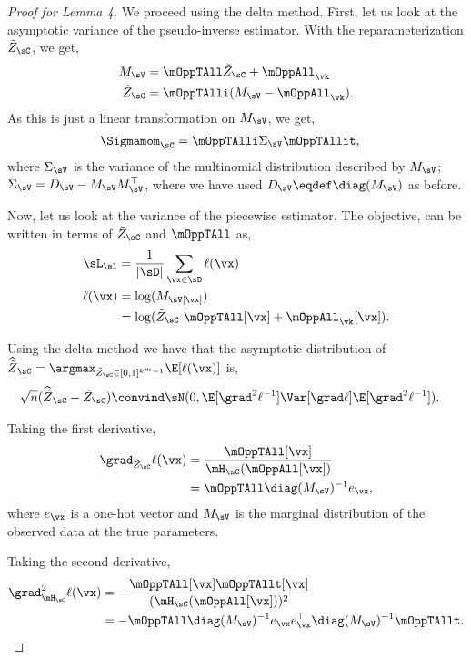 \begin{proof}[Proof for Lemma 4]
  We proceed using the delta method. First, let us look at the
  asymptotic variance of the pseudo-inverse estimator. With the
  reparameterization $\tilde Z_\sC$, we get,
  \begin{align*}
    M_\sV &= \mOppTAll \tilde Z_\sC + \mOppAll_\vk \\
    \tilde Z_\sC &= \mOppTAlli (M_\sV - \mOppAll_\vk).
  \end{align*}
  As this is just a linear transformation on $M_\sV$, we get,
  \begin{align*}
      \Sigmamom_{\sC} &= \mOppTAlli \Sigma_\sV \mOppTAllit,
  \end{align*}
  where $\Sigma_\sV$ is the variance of the multinomial distribution
  described by $M_\sV$; $\Sigma_\sV = D_\sV - M_\sV M_\sV^\top$, where
  we have used $D_\sV \eqdef \diag(M_\sV)$ as before.

  Now, let us look at the variance of the piecewise estimator.  The
  objective,  can be written in terms of
  $\tilde Z_\sC$ and $\mOppTAll$ as,
  \begin{align*}
    \sL_\ml &= \frac{1}{|\sD|} \sum_{\vx \in \sD} \ell(\vx) \\
    \ell(\vx) &= \log(M_\sV[\vx]) \\
              &= \log(\tilde Z_\sC\ \mOppTAll[\vx] + \mOppAll_{\vk}[\vx]).
  \end{align*}

Using the delta-method \cite{vaart98asymptotic} we have that the asymptotic distribution of 
  $\widehat{{\tilde Z}}_\sC = \argmax_{\tilde Z_\sC \in [0,1]^{k^m-1}} \E[\ell(\vx)]$ is,
  \begin{align*}
    \sqrt{n}(\widehat{\tilde{Z}}_{\sC} - \tilde{Z}_{\sC}) 
      &\convind \sN( 0, \E[\grad^2 \ell^{-1}] \Var[\grad \ell] \E[\grad^2 \ell^{-1}]).
  \end{align*}

Taking the first derivative,
\begin{align}
  \grad_{\tilde Z_\sC} \ell(\vx)
  &= \frac{\mOppTAll[\vx]}{\mH_\sC(\mOppAll[\vx]) } \nonumber \\ 
  &= \mOppTAll \diag(M_{\sV})^{-1} e_\vx, \label{eqn:lhood-grad}
\end{align}
where $e_\vx$ is a one-hot vector and $M_\sV$ is the marginal
distribution of the observed data at the true parameters.

Taking the second derivative,
\begin{align}
  \grad^2_{\tilde \mH_\sC} \ell(\vx)
  &= - \frac{\mOppTAll[\vx] \mOppTAllt[\vx]}{(\mH_\sC(\mOppAll[\vx]))^2} \nonumber \\
  &= - \mOppTAll \diag(M_{\sV})^{-1} e_\vx e_\vx^\top  \diag(M_{\sV})^{-1} \mOppTAllt. \label{eqn:lhood-hess}%
\end{align}


\end{proof}
